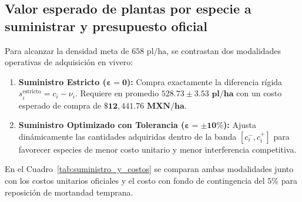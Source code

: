 \documentclass[11pt,a4paper]{article}
\begin{document}
\subsection{Valor esperado de plantas por especie a suministrar y presupuesto oficial}
Para alcanzar la densidad meta de $658\text{ pl/ha}$, se contrastan dos modalidades operativas de adquisición en vivero:
\begin{enumerate}[leftmargin=1.5em]
    \item \textbf{Suministro Estricto ($\boldsymbol{\varepsilon = 0}$):} Compra exactamente la diferencia rígida $s_i^{\text{estricto}} = c_i - \nu_i$. Requiere en promedio $\mathbf{528.73 \pm 3.53\text{ pl/ha}}$ con un costo esperado de compra de $\mathbf{\$12,441.76\text{ MXN/ha}}$.
    \item \textbf{Suministro Optimizado con Tolerancia ($\boldsymbol{\varepsilon = \pm 10\%}$):} Ajusta dinámicamente las cantidades adquiridas dentro de la banda $[c_i^-, c_i^+]$ para favorecer especies de menor costo unitario y menor interferencia competitiva.
\end{enumerate}

En el Cuadro~\ref{tab:suministro_y_costos} se comparan ambas modalidades junto con los costos unitarios oficiales y el costo con fondo de contingencia del $5\%$ para reposición de mortandad temprana.
\end{document}
